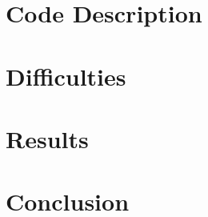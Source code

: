 \documentclass[a4paper,10pt]{article}
\begin{document}
\section{Code Description}

\section{Difficulties}

\section{Results}

\section{Conclusion}


\newpage
\end{document}
